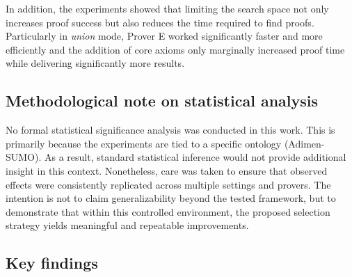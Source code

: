 \documentclass[english,version-2020-11]{uzl-thesis}
\begin{document}
In addition, the experiments showed that limiting the search space not only increases proof success but also reduces the time required to find proofs. Particularly in \textit{union} mode, Prover E worked significantly faster and more efficiently and the addition of core axioms only marginally increased proof time while delivering significantly more results.

\subsection*{Methodological note on statistical analysis}

No formal statistical significance analysis was conducted in this work. This is primarily because the experiments are tied to a specific ontology (Adimen-SUMO). As a result, standard statistical inference would not provide additional insight in this context. Nonetheless, care was taken to ensure that observed effects were consistently replicated across multiple settings and provers. The intention is not to claim generalizability beyond the tested framework, but to demonstrate that within this controlled environment, the proposed selection strategy yields meaningful and repeatable improvements.

\subsection*{Key findings}
\end{document}
